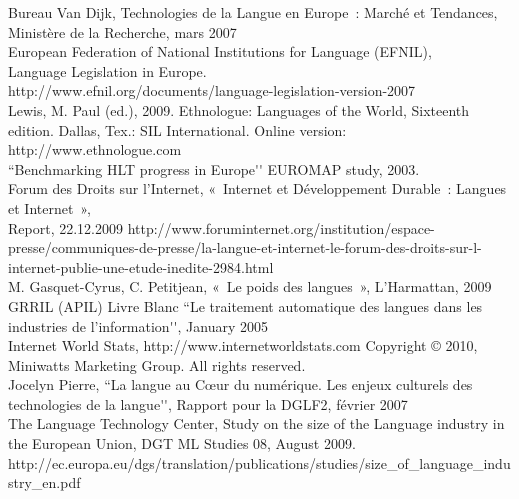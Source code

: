 \documentclass[]{../metanetpaper}
\begin{document}
\cleardoublepage

\appendix
{}


Bureau Van Dijk, Technologies de la Langue en Europe : Marché et Tendances, Ministère de la Recherche, mars 2007\\


European Federation of National Institutions for Language (EFNIL),\\
Language Legislation in Europe.\\
http://www.efnil.org/documents/language-legislation-version-2007\\


Lewis, M. Paul (ed.), 2009. Ethnologue: Languages of the World, Sixteenth edition. Dallas, Tex.: SIL International. Online version: http://www.ethnologue.com\\


``Benchmarking HLT progress in Europe{\mbox '}{\mbox '} EUROMAP study, 2003.
\\

Forum des Droits sur l’Internet, «~Internet et Développement Durable~: Langues et Internet~»,\\
Report, 22.12.2009 http://www.foruminternet.org/institution/espace-presse/communiques-de-presse/la-langue-et-internet-le-forum-des-droits-sur-l-internet-publie-une-etude-inedite-2984.html\\


M. Gasquet-Cyrus, C. Petitjean, «~Le poids des langues~», L’Harmattan, 2009\\

GRRIL (APIL) Livre Blanc ``Le traitement automatique des langues dans les industries de l’information{\mbox '}{\mbox '}, January 2005\\

Internet World Stats, http://www.internetworldstats.com Copyright © 2010, Miniwatts Marketing Group. All rights reserved.\\

Jocelyn Pierre, ``La langue au Cœur du numérique. Les enjeux culturels des technologies de la langue{\mbox '}{\mbox '}, Rapport pour la DGLF2, février 2007\\

The Language Technology Center, Study on the size of the Language industry in the European Union, DGT ML Studies 08, August 2009. http://ec.europa.eu/dgs/translation/publications/studies/size\_of\_language\_industry\_en.pdf\\
\end{document}
